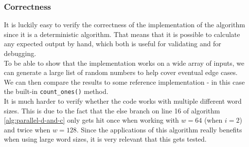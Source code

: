 \subsubsection{Correctness}
It is luckily easy to verify the correctness of the implementation of the algorithm since it is a deterministic algorithm. That means that it is possible to calculate any expected output by hand, which both is useful for validating and for debugging.\\
To be able to show that the implementation works on a wide array of inputs, we can generate a large list of random numbers to help cover eventual edge cases. We can then compare the results to some reference implementation - in this case the built-in \texttt{count\_ones()} method.\\
It is much harder to verify whether the code works with multiple different word sizes. This is due to the fact that the else branch on line 16 of algorithm \ref{alg:parallel-d-and-c} only gets hit once when working with $w=64$ (when $i=2$) and twice when $w=128$. Since the applications of this algorithm really benefits when using large word sizes, it is very relevant that this gets tested.

